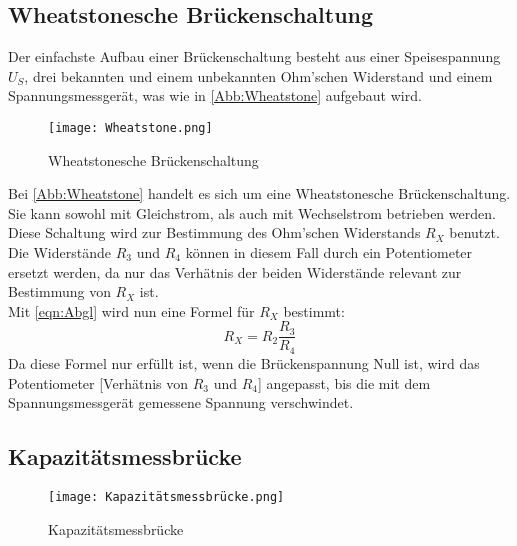 \subsection{Wheatstonesche Brückenschaltung}
 
Der einfachste Aufbau einer Brückenschaltung besteht aus einer Speisespannung $U_S$, drei bekannten und einem unbekannten Ohm'schen Widerstand und
einem Spannungsmessgerät, was wie in \autoref{Abb:Wheatstone} aufgebaut wird.

\begin{figure}
    \centering
    \texttt{[image: Wheatstone.png]}
    \caption{Wheatstonesche Brückenschaltung \cite{Blatt}}
    \label{Abb:Wheatstone}
\end{figure}

Bei \autoref{Abb:Wheatstone} handelt es sich um eine Wheatstonesche Brückenschaltung. Sie kann sowohl mit Gleichstrom, als auch mit Wechselstrom betrieben werden.
Diese Schaltung wird zur Bestimmung des Ohm'schen Widerstands $R_X$ benutzt. Die Widerstände $R_3$ und $R_4$ können in diesem Fall durch ein Potentiometer ersetzt werden,
da nur das Verhätnis der beiden Widerstände relevant zur Bestimmung von $R_X$ ist. \\
Mit \autoref{eqn:Abgl} wird nun eine Formel für $R_X$ bestimmt:
\begin{equation}
    R_X = R_2 \frac{R_3}{R_4}
\end{equation}
Da diese Formel nur erfüllt ist, wenn die Brückenspannung Null ist, wird das Potentiometer [Verhätnis von $R_3$ und $R_4$] angepasst, bis die
mit dem Spannungsmessgerät gemessene Spannung verschwindet.

\subsection{Kapazitätsmessbrücke}

\begin{figure}
    \centering
    \texttt{[image: Kapazitätsmessbrücke.png]}
    \caption{Kapazitätsmessbrücke \cite{Blatt}}
    \label{Abb:Kapazitaetsmessbruecke}
\end{figure}


